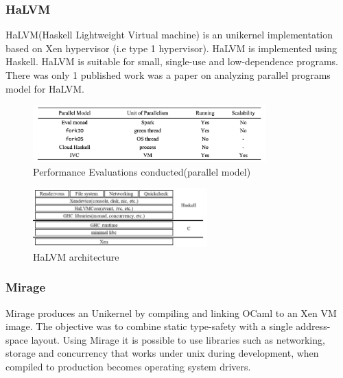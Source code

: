 \subsubsection{HaLVM}
HaLVM(Haskell Lightweight Virtual machine) is an unikernel implementation based on Xen hypervisor (i.e type 1 hypervisor). 
HaLVM is implemented using Haskell. HaLVM is suitable for small, single-use and
low-dependence programs. There was only 1 published work was a paper on analyzing 
parallel programs model for HaLVM\cite{HaLVM}. 


\begin{figure}[htbp!] 
  \centering    
  \includegraphics[width=0.8\textwidth]{halvm-execution}
  \caption[halvm-execution]{Performance Evaluations conducted(parallel model) \cite{HaLVM}}
  \label{fig:HaLVM}
  \end{figure}

\begin{figure}[htbp!] 
  \centering    
  \includegraphics[width=0.6\textwidth]{halvm}
  \caption[HaLVM]{HaLVM architecture \cite{HaLVM}}
  \label{fig:HaLVM}
  \end{figure}

  \subsubsection{Mirage}
  Mirage\cite{mirage} produces an Unikernel by compiling and 
  linking OCaml to an Xen VM image. The objective 
  was to combine static type-safety with a single
  address-space layout. Using Mirage it is possible 
  to use libraries such as networking, storage and concurrency
  that works under unix during development, when compiled 
  to production becomes operating system drivers. 

